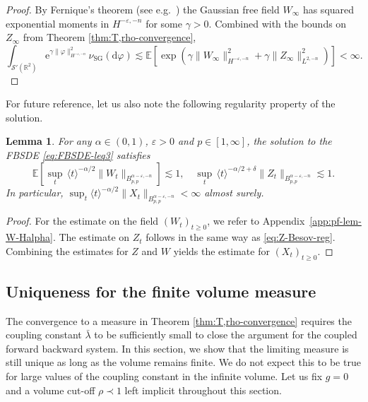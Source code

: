 \documentclass[11pt, a4paper]{scrartcl}
\numberwithin{equation}{section}
\theoremstyle{plain}
\newtheorem{lemma}[foo]{Lemma}
\theoremstyle{remark}
\newcommand{\mathd}{\mathrm{d}}
\newcommand{\mathe}{\mathrm{e}}
\newcommand{\tmop}[1]{\ensuremath{\operatorname{#1}}}
\newcommand{\tmtextit}[1]{\text{{\itshape{#1}}}}
\begin{document}
\begin{proof}
  By Fernique's theorem (see e.g.~{\cite[Theorem
  2.8.5.]{bogachevGaussianMeasures1998}}) the Gaussian free field $W_{\infty}$
  has squared exponential moments in $H^{- \varepsilon, - n}$ for some $\gamma
  > 0$. Combined with the bounds on $Z_{\infty}$ from Theorem
  \ref{thm:T,rho-convergence},
  \[ \int_{\mathcal{S}' (\mathbb{R}^2)} \mathe^{\gamma \| \varphi \|_{H^{-
     \varepsilon, - n}}^2} \nu_{\tmop{SG}} (\mathd \varphi) \lesssim
     \mathbb{E} [\exp (\gamma \| W_{\infty} \|_{H^{- \varepsilon, - n}}^2 +
     \gamma \| Z_{\infty} \|_{L^{2, - n}}^2)] < \infty . \]
\end{proof}

For future reference, let us also note the following regularity property of
the solution.

\begin{lemma}
  \label{lem:W-Halpha}For any $\alpha \in (0, 1)$, $\varepsilon > 0$ and $p
  \in [1, \infty]$, the solution to the FBSDE \eqref{eq:FBSDE-leq3} satisfies
  \[ \mathbb{E} \left[\sup_t\, \langle t \rangle^{- \alpha / 2} \| W_t \|_{B^{\alpha
     - \varepsilon, - n}_{p, p}}\right] \lesssim 1, \quad \sup_t\,  \langle t
     \rangle^{- \alpha / 2 + \delta} \| Z_t \|_{B^{\alpha - \varepsilon, -
     n}_{p, p}} \lesssim 1. \]
  In particular, $\sup_t  \langle t \rangle^{- \alpha / 2} \| X_t
  \|_{B^{\alpha - \varepsilon, - n}_{p, p}} < \infty$ almost surely.
\end{lemma}

\begin{proof}
  For the estimate on the field $(W_t)_{t \geqslant 0}$, we refer to
  Appendix~\ref{app:pf-lem-W-Halpha}. The estimate on $Z_t$ follows in the
  same way as \eqref{eq:Z-Besov-reg}. Combining the estimates for $Z$ and $W$
  yields the estimate for $(X_t)_{t \geqslant 0}$.
\end{proof}

\subsection{Uniqueness for the finite volume measure}\label{sec:finite-vol}

The convergence to a \tmtextit{unique} measure in Theorem \ref{thm:T,rho-convergence} requires the
coupling constant $\bar{\lambda}$ to be sufficiently small to close the argument for
the coupled forward backward system. In this section, we show that the limiting measure is still unique as long as the volume remains finite. We do
not expect this to be true for large values of the coupling constant in the
infinite volume. Let us fix $g = 0$ and a volume cut-off $\rho \prec 1$ left
implicit throughout this section.
\end{document}
